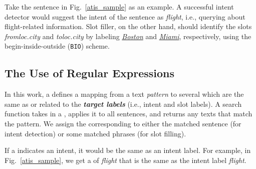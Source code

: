 
Take the sentence in Fig.~\ref{atis_sample} as an example.
A successful intent detector would suggest the intent of the sentence as \emph{flight}, i.e., querying
about flight-related information. Slot filler, on the other hand, should identify the slots \emph{fromloc.city} and
\emph{toloc.city} by labeling \underline{\textit{Boston}} and \underline{\textit{Miami}}, respectively,
using the begin-inside-outside (\texttt{BIO}) scheme.




\subsection{The Use of Regular Expressions}
\label{re_desc}

In this work, a \RE defines a mapping from a text \emph{pattern} to several \textbf{\emph{\REtags}} which are  the same as or related to
the \textbf{\emph{target labels}} (i.e., intent and slot labels). A search function takes in a \RE, applies it to all sentences, and
returns
any texts that match the pattern. %
We assign the corresponding \REtag to either the matched sentence (for intent detection) or some matched phrases (for slot filling).


If a \REtag indicates an intent, it would be the same as an intent label.
For example,  %
in Fig.~\ref{atis_sample},
we get a \REtag of \emph{flight} that is the same as %
 the intent label \emph{flight}.



